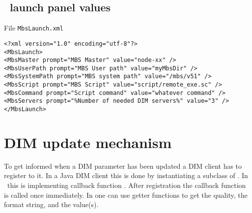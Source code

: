 \subsection[MBS launch panel values]{\mbs\ launch panel values}
File {\tt MbsLaunch.xml}
{\small \begin{verbatim}
<?xml version="1.0" encoding="utf-8"?>
<MbsLaunch>
<MbsMaster prompt="MBS Master" value="node-xx" />
<MbsUserPath prompt="MBS User path" value="myMbsDir" />
<MbsSystemPath prompt="MBS system path" value="/mbs/v51" />
<MbsScript prompt="MBS Script" value="script/remote_exe.sc" />
<MbsCommand prompt="Script command" value="whatever command" />
<MbsServers prompt="%Number of needed DIM servers%" value="3" />
</MbsLaunch>
\end{verbatim}
}
\section{DIM update mechanism}
To get informed when a DIM parameter has been updated a DIM client has to register to it.
In a Java DIM client this is done by instantiating a subclass of .
In \gui\ this is  implementing callback function .
After registration the callback function is called once immediately.
In  one can use getter functions to get the quality, the format string,
and the value(s).
